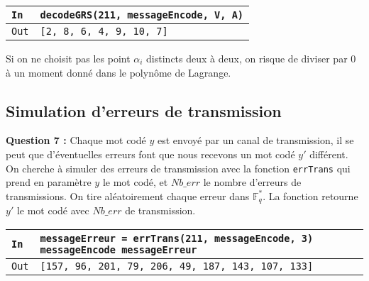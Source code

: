 \documentclass[titlepage]{article}
\begin{document}
        

        \begin{tabularx}{12cm}{|p{0.60cm}|X|}
            \hline
            \rowcolor{gray}
            \texttt{In}
            & 
            \texttt{decodeGRS(211, messageEncode, V, A)}
            \\
            \hline
            \texttt{Out}
            &
            \texttt{[2, 8, 6, 4, 9, 10, 7]}
            \\
            \hline
        \end{tabularx}
        \bigbreak

        Si on ne choisit pas les point $\alpha_i$ distincts deux à deux, on risque de diviser par 0 à un moment donné dans le polynôme de Lagrange.

        \subsection{Simulation d’erreurs de transmission}
        \textbf{Question 7 :}
        Chaque mot codé $y$ est envoyé par un canal de transmission, il se peut que d'éventuelles erreurs font que nous recevons un mot codé $y'$ différent.
        On cherche à simuler des erreurs de transmission avec la fonction \texttt{errTrans} qui prend en paramètre $y$ le mot codé, et $Nb\_err$ le nombre d'erreurs de transmissions.
        On tire aléatoirement chaque erreur dans $\mathbb{F}_q^*$. La fonction retourne $y'$ le mot codé avec $Nb\_err$ de transmission.

        

        \begin{tabularx}{12cm}{|p{0.60cm}|X|}
            \hline
            \rowcolor{gray}
            \texttt{In}
            & 
            \texttt{messageErreur = errTrans(211, messageEncode, 3) \newline
            messageEncode \newline
            messageErreur}
            \\
            \hline
            \texttt{Out}
            &
            \texttt{[157, 96, 201, 79, 206, 49, 187, 143, 107, 133]\newline
            [157, 30, 201, 164, 206, 1, 187, 143, 107, 133]}
            \\
            \hline
        \end{tabularx}
        \bigbreak
\end{document}
